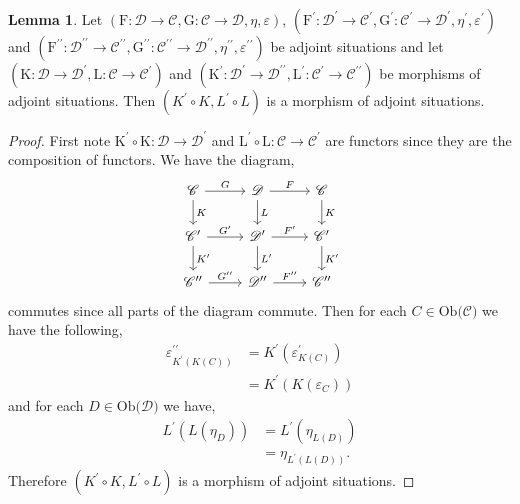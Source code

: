 \documentclass[11pt,a4paper]{article}
\theoremstyle{definition}
\newtheorem{lemma}[thm]{Lemma}
\newcommand\ob[1]{\mathrm{Ob(}#1\mathrm{)}}
\newcommand\cat[1]{\mathscr{#1}}
\newcommand\func[3]{\mathrm{#1}\colon#2\rightarrow#3}
\numberwithin{equation}{section}
\begin{document}
\begin{lemma}
    \label{lem:compmorphadjsit}
    Let $(\func{F}{\cat{D}}{\cat{C}},\func{G}{\cat{C}}{\cat{D}},\eta,\varepsilon)$, $(\func{F^\prime}{\cat{D^\prime}}{\cat{C^\prime}},\func{G^\prime}{\cat{C^\prime}}{\cat{D^\prime}},\eta^\prime,\varepsilon^\prime)$ and $(\func{F^{\prime\prime}}{\cat{D^{\prime\prime}}}{\cat{C^{\prime\prime}}},\func{G^{\prime\prime}}{\cat{C^{\prime\prime}}}{\cat{D^{\prime\prime}}},\eta^{\prime\prime},\varepsilon^{\prime\prime})$ be adjoint situations and let $(\func{K}{\cat{D}}{\cat{D^\prime}},\func{L}{\cat{C}}{\cat{C^\prime}})$ and $(\func{K^\prime}{\cat{D^\prime}}{\cat{D^{\prime\prime}}},\func{L^\prime}{\cat{C^\prime}}{\cat{C^{\prime\prime}}})$ be morphisms of adjoint situations. Then $(K^\prime \circ K,L^\prime\circ L)$ is a morphism of adjoint situations.
\end{lemma}
\begin{proof}
    First note $\func{K^\prime \circ K}{\cat{D}}{\cat{D^\prime}}$ and $\func{L^\prime\circ L}{\cat{C}}{\cat{C^\prime}}$ are functors since they are the composition of functors. We have the diagram,
    \begin{equation*}
    \begin{tikzcd}
            \cat{C} \arrow[r, "G"] \arrow[d, "K"] & \cat{D} \arrow[r, "F"] \arrow[d, "L"] & \cat{C} \arrow[d, "K"] \\
            \cat{C^\prime} \arrow[r, "G^\prime"] \arrow[d, "K^\prime"]& \cat{D^\prime} \arrow[r, "F^\prime"] \arrow[d,"L^\prime"] & \cat{C^\prime} \arrow[d,"K^\prime"]\\
            \cat{C^{\prime\prime}} \arrow[r, "G^{\prime\prime}"] & \cat{D^{\prime\prime}} \arrow[r, "F^{\prime\prime}"] & \cat{C^{\prime\prime}}
        \end{tikzcd}
    \end{equation*}
    commutes since all parts of the diagram commute.
    Then for each $C\in\ob{\cat{C}}$ we have the following,
    \begin{align*}
        \varepsilon^{\prime\prime}_{K^\prime(K(C))} &= K^\prime(\varepsilon^\prime_{K(C)}) \\
        &= K^\prime(K(\varepsilon_{C}))
    \end{align*}
    and for each $D\in\ob{\cat{D}}$ we have,
    \begin{align*}
        L^\prime(L(\eta_{D})) &= L^\prime(\eta_{L(D)}) \\
        &= \eta_{L^\prime(L(D))}.
    \end{align*}
    Therefore $(K^\prime \circ K, L^\prime \circ L)$ is a morphism of adjoint situations.
\end{proof}
\end{document}
